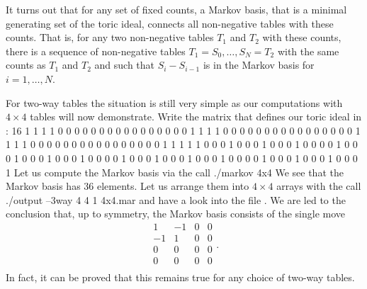 \documentclass[12pt]{article}
\newenvironment{myverbatim}%
  {\quote\verbatim}%
  {\endverbatim\endquote}
\newcommand\File{\begingroup \urlstyle{sf}\Url}
\theoremstyle{definition}
\begin{document}
It turns out that for any set of fixed counts, a Markov
basis, that is a minimal generating set of the toric ideal, connects
all non-negative tables with these counts. That is, for any two non-negative
tables $T_1$ and $T_2$ with these counts, there is a sequence of non-negative
tables $T_1=S_0,\ldots, S_N=T_2$ with the same counts as $T_1$ and
$T_2$ and such that $S_i-S_{i-1}$ is in the Markov basis for
$i=1,\ldots, N$.

For two-way tables the situation is still very simple as our
computations with $4\times 4$ tables will now demonstrate.
Write the matrix that defines our toric ideal in \File{4x4}:
\begin{myverbatim}
8 16
1 1 1 1 0 0 0 0 0 0 0 0 0 0 0 0
0 0 0 0 1 1 1 1 0 0 0 0 0 0 0 0
0 0 0 0 0 0 0 0 1 1 1 1 0 0 0 0
0 0 0 0 0 0 0 0 0 0 0 0 1 1 1 1
1 0 0 0 1 0 0 0 1 0 0 0 1 0 0 0
0 1 0 0 0 1 0 0 0 1 0 0 0 1 0 0
0 0 1 0 0 0 1 0 0 0 1 0 0 0 1 0
0 0 0 1 0 0 0 1 0 0 0 1 0 0 0 1
\end{myverbatim}
Let us compute the Markov basis via the call
\begin{myverbatim}
./markov 4x4
\end{myverbatim}
We see that the Markov basis has $36$ elements. Let us arrange them
into $4\times 4$ arrays with the call
\begin{myverbatim}
./output --3way 4 4 1 4x4.mar
\end{myverbatim}
and have a look into the file \File{4x4.mar.3way}. We are led to the
conclusion that, up to symmetry, the Markov basis consists of the
single move
\[
\begin{array}{rrrr}
 1 & -1 &  0 &  0\\
-1 &  1 &  0 &  0\\
 0 &  0 &  0 &  0\\
 0 &  0 &  0 &  0\\
\end{array}.
\]
In fact, it can be proved that this remains true for any choice of
two-way tables.
\end{document}
